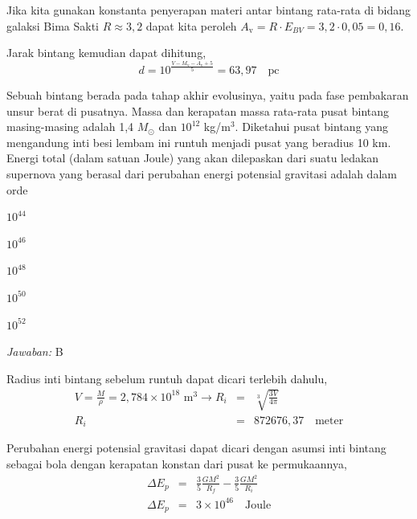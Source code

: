 \documentclass[11pt,fleqn]{exam}
\newcommand*{\Msun}{\ensuremath{M_{\odot}}}
\begin{document}
\begin{questions}
Jika kita gunakan konstanta penyerapan materi antar bintang rata-rata di bidang galaksi Bima Sakti  $R \approx 3,2$ dapat kita peroleh $A_\text{v} = R \cdot E_{BV} = 3,2 \cdot 0,05 = 0,16$. 

Jarak bintang kemudian dapat dihitung,
$$d = 10^{\frac{V - M_{\text{v}} - A_{\text{v}} + 5}{5}} = 63,97 \quad \text{pc}$$


\vspace{0.5cm}
\question Sebuah bintang berada pada tahap akhir evolusinya, yaitu pada fase pembakaran unsur berat di pusatnya. Massa dan kerapatan massa rata-rata pusat bintang masing-masing adalah 1,4 \Msun{} dan $10^{12}$ kg/m$^3$. Diketahui pusat bintang yang mengandung inti besi lembam ini runtuh menjadi pusat yang beradius 10 km. Energi total (dalam satuan Joule) yang akan dilepaskan dari suatu ledakan supernova yang berasal dari perubahan energi potensial gravitasi adalah dalam orde
\begin{choices}
\item $10^{44}$
\item $10^{46}$
\item $10^{48}$
\item $10^{50}$
\item $10^{52}$
\end{choices}


\textit{Jawaban: }B

Radius inti bintang sebelum runtuh dapat dicari terlebih dahulu,
\begin{eqnarray*}
V = \frac{M}{\rho} = 2,784 \times 10^{18} \text{  m}^3 \longrightarrow R_i &=& \sqrt[3]{\frac{3V}{4 \pi}}\\
R_i &=& 872676,37 \quad \text{meter} 
\end{eqnarray*}

Perubahan energi potensial gravitasi dapat dicari dengan asumsi inti bintang sebagai bola dengan kerapatan konstan dari pusat ke permukaannya,
\begin{eqnarray*}
\Delta E_p &=& \frac{3}{5}\frac{GM^2}{R_f} - \frac{3}{5}\frac{GM^2}{R_i}\\
\Delta E_p &=& 3 \times 10^{46} \quad \text{Joule}
\end{eqnarray*}



\end{questions}
\end{document}
